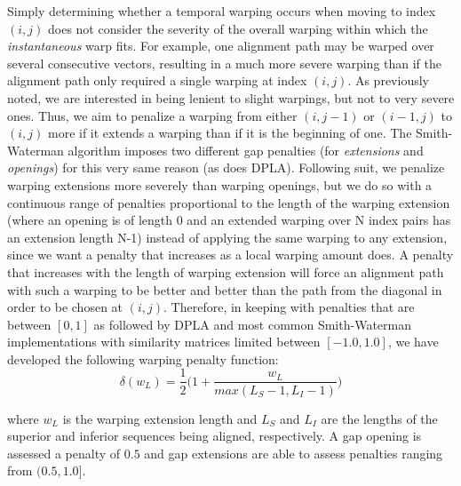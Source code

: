 \documentclass[12pt]{report} 	%
\numberwithin{figure}{chapter}
\numberwithin{table}{chapter}
\numberwithin{equation}{chapter}
\begin{document}
\begin{flushleft}
Simply determining whether a temporal warping occurs when moving to index $(i,j)$ does not consider the severity of the overall warping within which the \textit{instantaneous} warp fits. For example, one alignment path may be warped over several consecutive vectors, resulting in a much more severe warping than if the alignment path only required a single warping at index $(i,j)$. As previously noted, we are interested in being lenient to slight warpings, but not to very severe ones. Thus, we aim to penalize a warping from either $(i,j-1)$ or $(i-1,j)$ to $(i,j)$ more if it extends a warping than if it is the beginning of one. The Smith-Waterman algorithm imposes two different gap penalties (for \textit{extensions} and \textit{openings}) for this very same reason (as does DPLA). Following suit, we penalize warping extensions more severely than warping openings, but we do so with a continuous range of penalties proportional to the length of the warping extension (where an opening is of length 0 and an extended warping over N index pairs has an extension length N-1) instead of applying the same warping to any extension, since we want a penalty that increases as a local warping amount does. A penalty that increases with the length of warping extension will force an alignment path with such a warping to be better and better than the path from the diagonal in order to be chosen at $(i,j)$. Therefore, in keeping with penalties that are between $[0,1]$ as followed by DPLA and most common Smith-Waterman implementations with similarity matrices limited between $[-1.0,1.0]$, we have developed the following warping penalty function:
\begin{equation}
\delta(w_L) = \frac{1}{2}\bigg(1 + \frac{w_L}{max(L_S - 1,L_I - 1)}\bigg)
\end{equation}

\vspace{3 mm}
\noindent where $w_L$ is the warping extension length and $L_S$ and $L_I$ are the lengths of the superior and inferior sequences being aligned, respectively. A gap opening is assessed a penalty of $0.5$ and gap extensions are able to assess penalties ranging from $(0.5,1.0]$.


\end{flushleft}
\end{document}
